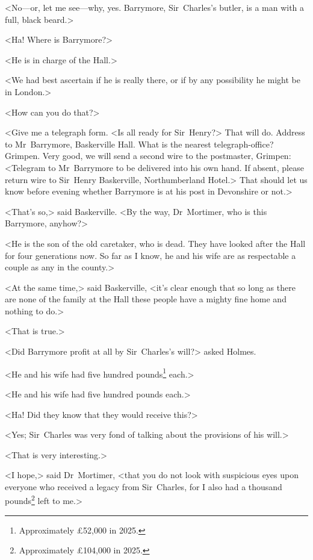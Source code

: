 <No—or, let me see—why, yes. Barrymore, Sir~Charles's butler, is a man with a full, black beard.>

<Ha! Where is Barrymore?>

<He is in charge of the Hall.>

<We had best ascertain if he is really there, or if by any possibility he might be in London.>

<How can you do that?>

<Give me a telegraph form. <Is all ready for Sir~Henry?> That will do. Address to Mr~Barrymore, Baskerville Hall. What is the nearest telegraph-office? Grimpen. Very good, we will send a second wire to the postmaster, Grimpen: <Telegram to Mr~Barrymore to be delivered into his own hand. If absent, please return wire to Sir~Henry Baskerville, Northumberland Hotel.> That should let us know before evening whether Barrymore is at his post in Devonshire or not.>

<That's so,> said Baskerville. <By the way, Dr~Mortimer, who is this Barrymore, anyhow?>

<He is the son of the old caretaker, who is dead. They have looked after the Hall for four generations now. So far as I know, he and his wife are as respectable a couple as any in the county.>

<At the same time,> said Baskerville, <it's clear enough that so long as there are none of the family at the Hall these people have a mighty fine home and nothing to do.>

<That is true.>

<Did Barrymore profit at all by Sir~Charles's will?> asked Holmes.

\begin{withfootnotes}
<He and his wife had five hundred pounds\footnote{Approximately \pounds 52,000 in 2025.} each.>
\end{withfootnotes}

\begin{withoutfootnotes}
<He and his wife had five hundred pounds each.>
\end{withoutfootnotes}

<Ha! Did they know that they would receive this?>

<Yes; Sir~Charles was very fond of talking about the provisions of his will.>

<That is very interesting.>

\begin{withfootnotes}
<I hope,> said Dr~Mortimer, <that you do not look with suspicious eyes upon everyone who received a legacy from Sir~Charles, for I also had a thousand pounds\footnote{Approximately \pounds 104,000 in 2025.} left to me.>
\end{withfootnotes}


